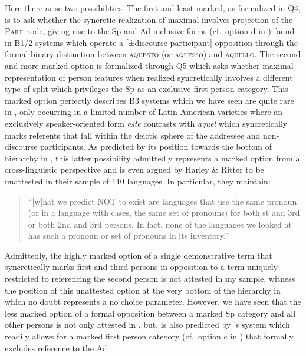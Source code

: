 \documentclass[output=paper]{langsci/langscibook}
\begin{document}
Here there arise two possibilities. The first and least marked, as formalized
in Q4, is to ask whether the syncretic realization of maximal 
involves projection of the \textsc{Part} node, giving rise to the Sp and Ad
inclusive forms (cf.\ option d in ) found in
B1/2 systems which operate a [±discourse participant]
opposition through the formal binary distinction between \textsc{aquesto} (or
\textsc{aquesso}) and \textsc{aquello}. The second and more marked option is
formalized through Q5 which asks whether maximal representation of person
features when realized syncretically involves a different type of split which
privileges the Sp as an exclusive first person category. This marked option
perfectly describes B3 systems which we have seen are quite rare in ,
only occurring in a limited number of Latin-American  varieties where an
exclusively speaker-oriented form \emph{este} contrasts with \emph{aquel} which
syncretically marks referents that fall within the deictic sphere of the
addressee and non-discourse participants. As predicted by its position towards
the bottom of hierarchy in , this latter possibility
admittedly represents a marked option from a cross-linguistic perspective and
is even argued by Harley \& Ritter to be unattested in their sample of 110
languages. In particular, they maintain:

\begin{quotation}
    \enquote{[w]hat we predict NOT to exist are languages that use the same pronoun (or
    in a language with cases, the same set of pronouns) for both \First{}st and
    3rd or both 2nd and 3rd persons.  In fact, none of the languages we looked
    at has such a pronoun or set of pronouns in its
    inventory.} \parencite[513]{HarRit2002}
\end{quotation}

Admittedly, the highly marked option of a single demonstrative term that
syncretically marks first and third persons in opposition to a term uniquely
restricted to referencing the second person is not attested in my 
sample, witness the position of this unattested option at the very bottom of
the hierarchy in  which no doubt represents a no choice
parameter. However, we have seen that the less marked option of a formal
opposition between a marked Sp category and all other persons is not only
attested in , but, is also predicted by \citeauthor{HarRit2002}'s system
which readily allows for a marked first person category (cf.\ option c in
) that formally excludes reference to the Ad.
\end{document}
